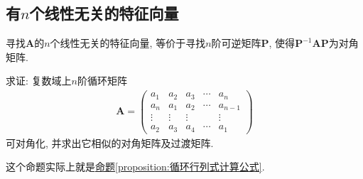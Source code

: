 \documentclass[../../main.tex]{subfiles}%
\begin{document}
\subsection{有$n$个线性无关的特征向量}

寻找\(\boldsymbol{A}\)的\(n\)个线性无关的特征向量, 等价于寻找\(n\)阶可逆矩阵\(\boldsymbol{P}\), 使得\(\boldsymbol{P}^{-1}\boldsymbol{AP}\)为对角矩阵.

\begin{proposition}[循环矩阵一定可对角化]\label{proposition:循环矩阵一定可对角化}
求证: 复数域上\(n\)阶循环矩阵
\begin{align*}
\boldsymbol{A}=\begin{pmatrix}
a_{1}&a_{2}&a_{3}&\cdots&a_{n}\\
a_{n}&a_{1}&a_{2}&\cdots&a_{n - 1}\\
\vdots&\vdots&\vdots&&\vdots\\
a_{2}&a_{3}&a_{4}&\cdots&a_{1}
\end{pmatrix}
\end{align*}
可对角化, 并求出它相似的对角矩阵及过渡矩阵.
\end{proposition}
\begin{note}
这个命题实际上就是\hyperref[proposition:循环行列式计算公式]{命题\ref{proposition:循环行列式计算公式}}.
\end{note}
\end{document}
